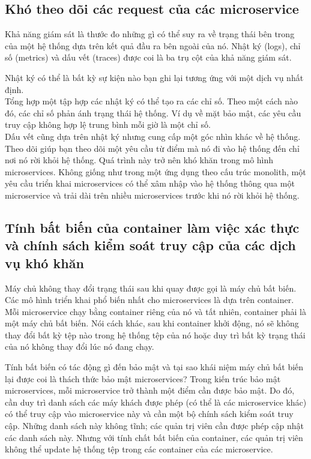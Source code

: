 \documentclass[14pt,a4paper]{book}
\begin{document}
		\subsection{Khó theo dõi các request của các microservice}
				{\hspace{0.6cm}Khả năng giám sát là thước đo những gì có thể suy ra về trạng thái bên trong của một hệ thống dựa trên kết quả đầu ra bên ngoài của nó. Nhật ký (logs), chỉ số (metrics) và dấu vết (traces) được coi là ba trụ cột của khả năng giám sát.\\}
				
				Nhật ký có thể là bất kỳ sự kiện nào bạn ghi lại tương ứng với một dịch vụ nhất định.\\
				
				Tổng hợp một tập hợp các nhật ký có thể tạo ra các chỉ số. Theo một cách nào đó, các chỉ số phản ánh trạng thái hệ thống. Ví dụ về mặt bảo mật, các yêu cầu truy cập không hợp lệ trung bình mỗi giờ là một chỉ số.\\
				
				Dấu vết cũng dựa trên nhật ký nhưng cung cấp một góc nhìn khác về hệ thống. Theo dõi giúp bạn theo dõi một yêu cầu từ điểm mà nó đi vào hệ thống đến chỉ nơi nó rời khỏi hệ thống. Quá trình này trở nên khó khăn trong mô hình microservices. Không giống như trong một ứng dụng theo cấu trúc monolith, một yêu cầu triển khai microservices có thể xâm nhập vào hệ thống thông qua một microservice và trải dài trên nhiều microservices trước khi nó rời khỏi hệ thống.			
		\subsection{Tính bất biến của container làm việc xác thực và chính sách kiểm soát truy cập của các dịch vụ khó khăn}
				{\hspace{0.6cm}Máy chủ không thay đổi trạng thái sau khi quay được gọi là máy chủ bất biến. Các mô hình triển khai phổ biến nhất cho microservices là dựa trên container. Mỗi microservice chạy bằng container riêng của nó và tất nhiên, container phải là một máy chủ bất biến. Nói cách khác, sau khi container khởi động, nó sẽ không thay đổi bất kỳ tệp nào trong hệ thống tệp của nó hoặc duy trì bất kỳ trạng thái của nó không thay đổi lúc nó đang chạy.\\}
				
				Tính bất biến có tác động gì đến bảo mật và tại sao khái niệm máy chủ bất biến lại được coi là thách thức bảo mật microservices? Trong kiến trúc bảo mật microservices, mỗi microservice trở thành một điểm cần được bảo mật. Do đó, cần duy trì danh sách các máy khách được phép (có thể là các microservice khác) có thể truy cập vào microservice này và cần một bộ chính sách kiểm soát truy cập. Những danh sách này không tĩnh; các quản trị viên cần được phép cập nhật các danh sách này. Nhưng với tính chất bất biến của container, các quản trị viên không thể update hệ thống tệp trong các container của các microservice.
\end{document}
